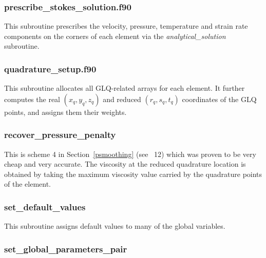  \subsubsection{prescribe\_stokes\_solution.f90}
 This subroutine prescribes the velocity, pressure, temperature and strain rate components
 on the corners of each element via the {\sl analytical\_solution} subroutine.
 \subsubsection{quadrature\_setup.f90}
 This subroutine allocates all GLQ-related arrays for each element.
 It further computes the real $(x_q,y_q,z_q)$ and reduced $(r_q,s_q,t_q)$
 coordinates of the GLQ points, and assigns them their weights.
 \subsubsection{recover\_pressure\_penalty}
 This is scheme 4 in Section~\ref{psmoothing} (see \stone~12) which was proven to be 
 very cheap and very accurate. 
 The viscosity at the reduced quadrature location 
 is obtained by taking the maximum viscosity value carried by the quadrature points of 
 the element. 
 \subsubsection{set\_default\_values}
 This subroutine assigns default values to many of the global variables.
 \subsubsection{set\_global\_parameters\_pair}

